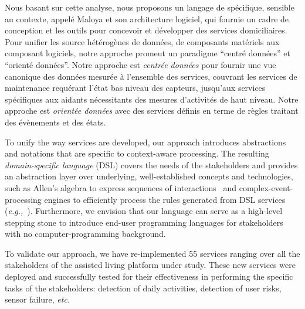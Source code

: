 Nous basant sur cette analyse, nous proposons un langage de spécifique, sensible au contexte, appelé Maloya et son architecture logiciel, qui fournie un cadre de conception et les outils pour concevoir et développer des services domiciliaires. Pour unifier les source hétérogènes de données, de composants matériels aux composant logiciels, notre approche promeut un paradigme ``centré données'' et ``orienté données''. Notre approche est {\em centrée données} pour fournir une vue canonique des données mesurée à l'ensemble des services, couvrant les services de maintenance requérant l'état bas niveau des capteurs, jusqu'aux services spécifiques aux aidants nécessitants des mesures d'activités de haut niveau. Notre approche est {\em orientée données} avec des services définis en terme de règles traitant des évènements et des états.


To unify the way services are developed, our approach introduces abstractions and notations that are specific to context-aware processing. The resulting {\em domain-specific language} (DSL) covers the needs of the stakeholders and provides an abstraction layer over underlying, well-established concepts and technologies, such as Allen's algebra to express sequences of interactions~\cite{Allen} and complex-event-processing engines to efficiently process the rules generated from DSL services ({\em e.g.,}~\cite{Cugola:2012:PFI:2187671.2187677}). Furthermore, we envision that our language can serve as a high-level stepping stone to introduce end-user programming languages for stakeholders with no computer-programming background.

To validate our approach, we have re-implemented 55 services ranging over all the stakeholders of the assisted living platform under study. These new services were deployed and successfully tested for their effectiveness in performing the specific tasks of the stakeholders: detection of daily activities, detection of user risks, sensor failure, {\em etc.}



